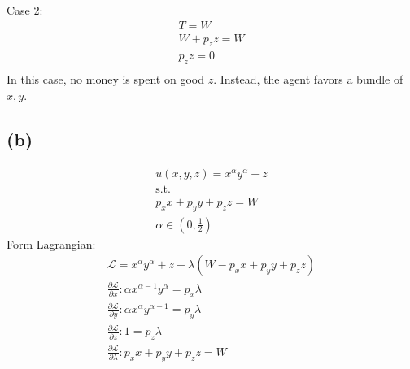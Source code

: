 \documentclass[10pt, a4paper]{article}
\begin{document}
      Case 2:
      \begin{gather*}
        T = W \\
        W + p_zz = W \\
        p_zz = 0 \\
      \end{gather*}
      In this case, no money is spent on good $z$. Instead, the agent favors a bundle of $x,y$.
    \subsection*{(b)}
      \begin{gather*}
        u(x,y,z) = x^{\alpha}y^{\alpha} + z \\
        \text{s.t.} \\
        p_xx + p_yy + p_zz = W \\
        \alpha\in(0,\frac{1}{2})
      \end{gather*}
      Form Lagrangian:
      \begin{gather*}
        \mathcal{L} = x^{\alpha}y^{\alpha} + z + \lambda(W - p_xx + p_yy + p_zz) \\
        \frac{\partial \mathcal{L}}{\partial x}: \alpha x^{\alpha-1}y^{\alpha} = p_x\lambda \\
        \frac{\partial \mathcal{L}}{\partial y}: \alpha x^{\alpha}y^{\alpha-1} = p_y\lambda \\
        \frac{\partial \mathcal{L}}{\partial z}: 1 = p_z\lambda \\
        \frac{\partial \mathcal{L}}{\partial \lambda}: p_xx + p_yy + p_zz = W \\
      \end{gather*}
      
\end{document}
